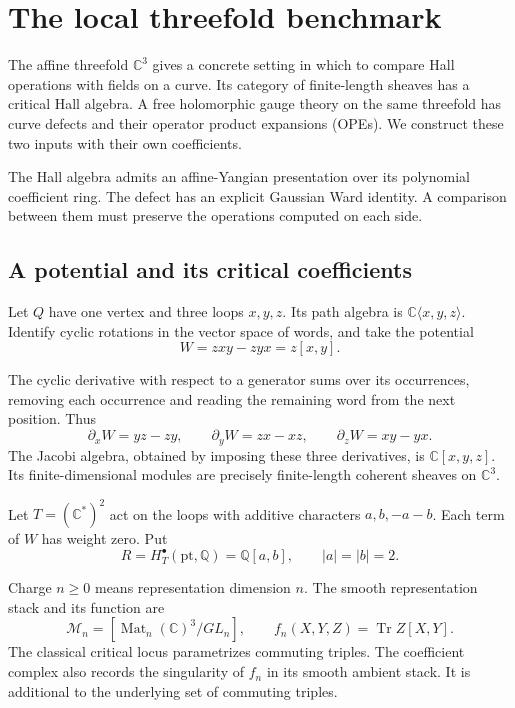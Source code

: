 \chapter{The local threefold benchmark}
\label{cylocal:ch:benchmark}

The affine threefold $\mathbb C^3$ gives a concrete setting in which to
compare Hall operations with fields on a curve. Its category of
finite-length sheaves has a critical Hall algebra. A free holomorphic
gauge theory on the same threefold has curve defects and their
operator product expansions (OPEs). We construct these two inputs
with their own coefficients.

The Hall algebra admits an affine-Yangian
presentation over its polynomial coefficient ring. The
defect has an explicit Gaussian Ward identity. A comparison between
them must preserve the operations computed on each side.

\section{A potential and its critical coefficients}
\label{cylocal:sec:critical}

Let $Q$ have one vertex and three loops $x,y,z$. Its path algebra is
$\mathbb C\langle x,y,z\rangle$. Identify cyclic rotations in the
vector space of words, and take the potential
\begin{equation}\label{cylocal:eq:potential}
 W=zxy-zyx=z[x,y].
\end{equation}

The cyclic derivative with respect to a generator sums over its
occurrences, removing each occurrence and reading the remaining
word from the next position. Thus
\[
 \partial_xW=yz-zy,\qquad
 \partial_yW=zx-xz,\qquad
 \partial_zW=xy-yx.
\]
The Jacobi algebra, obtained by imposing these three derivatives,
is $\mathbb C[x,y,z]$. Its finite-dimensional modules are precisely
finite-length coherent sheaves on $\mathbb C^3$.

Let $T=(\mathbb C^*)^2$ act on the loops with additive characters
$a,b,-a-b$. Each term of $W$ has weight zero. Put
\[
 R=H_T^\bullet(\mathrm{pt},\mathbb Q)=\mathbb Q[a,b],
 \qquad |a|=|b|=2.
\]

Charge $n\geq0$ means representation dimension $n$. The smooth
representation stack and its function are
\[
 \mathcal M_n=[\operatorname{Mat}_n(\mathbb C)^3/GL_n],
 \qquad f_n(X,Y,Z)=\operatorname{Tr}Z[X,Y].
\]
The classical critical locus parametrizes commuting triples. The coefficient
complex also records the singularity of $f_n$ in its smooth ambient
stack. It is additional to the underlying set of commuting triples.

